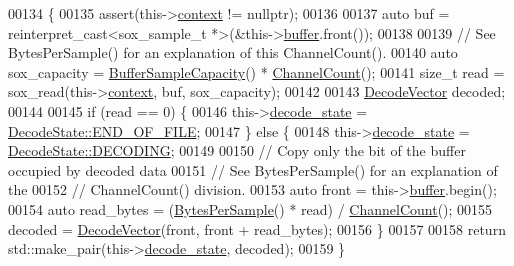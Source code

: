 \begin{DoxyCode}
00134 \{
00135     assert(this->\hyperlink{classAudioSource_a2bbce89d4bef9cf46b1113de3245655a}{context} != \textcolor{keyword}{nullptr});
00136 
00137     \textcolor{keyword}{auto} buf = \textcolor{keyword}{reinterpret\_cast<}sox\_sample\_t *\textcolor{keyword}{>}(&this->\hyperlink{classAudioSource_ad278f3b315e3ad91add683d5eda48a03}{buffer}.front());
00138 
00139     \textcolor{comment}{// See BytesPerSample() for an explanation of this ChannelCount().}
00140     \textcolor{keyword}{auto} sox\_capacity = \hyperlink{classAudioSource_af63c7249c1cf8d4ef86274ea2fdc1f26}{BufferSampleCapacity}() * 
      \hyperlink{classAudioSource_a267178b39a3a4d2fc86f41f6a96caf03}{ChannelCount}();
00141     \textcolor{keywordtype}{size\_t} read = sox\_read(this->\hyperlink{classAudioSource_a2bbce89d4bef9cf46b1113de3245655a}{context}, buf, sox\_capacity);
00142 
00143     \hyperlink{classAudioSource_a836c61e348dbe7df6ba255669c015303}{DecodeVector} decoded;
00144 
00145     \textcolor{keywordflow}{if} (read == 0) \{
00146         this->\hyperlink{classAudioSource_abe3899ebe685335a84c5bfee5a20a96f}{decode\_state} = \hyperlink{classAudioSource_a9a2f5de44325c84e69a7af1331aa159da581953f6b20ad7f993b64b1dc632032e}{DecodeState::END\_OF\_FILE};
00147     \} \textcolor{keywordflow}{else} \{
00148         this->\hyperlink{classAudioSource_abe3899ebe685335a84c5bfee5a20a96f}{decode\_state} = \hyperlink{classAudioSource_a9a2f5de44325c84e69a7af1331aa159da9b75f3acd3c3480965b0f5ee466e7f25}{DecodeState::DECODING};
00149 
00150         \textcolor{comment}{// Copy only the bit of the buffer occupied by decoded data}
00151         \textcolor{comment}{// See BytesPerSample() for an explanation of the}
00152         \textcolor{comment}{// ChannelCount() division.}
00153         \textcolor{keyword}{auto} front = this->\hyperlink{classAudioSource_ad278f3b315e3ad91add683d5eda48a03}{buffer}.begin();
00154         \textcolor{keyword}{auto} read\_bytes = (\hyperlink{classAudioSource_ae6eb4d0fc3d1d60375edc2745b635818}{BytesPerSample}() * read) / \hyperlink{classAudioSource_a267178b39a3a4d2fc86f41f6a96caf03}{ChannelCount}();
00155         decoded = \hyperlink{classAudioSource_a836c61e348dbe7df6ba255669c015303}{DecodeVector}(front, front + read\_bytes);
00156     \}
00157 
00158     \textcolor{keywordflow}{return} std::make\_pair(this->\hyperlink{classAudioSource_abe3899ebe685335a84c5bfee5a20a96f}{decode\_state}, decoded);
00159 \}
\end{DoxyCode}
